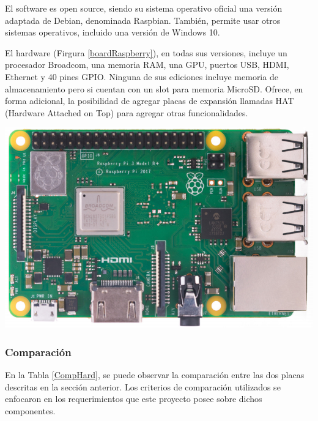             \par El software es open source, siendo su sistema operativo oficial una versión adaptada de Debian, denominada Raspbian. También, permite usar otros sistemas operativos, incluido una versión de Windows 10.
        
            \par El hardware (Firgura \ref{boardRaspberry}), en todas sus versiones, incluye un procesador Broadcom, una memoria RAM, una GPU, puertos USB, HDMI, Ethernet y 40 pines GPIO. Ninguna de sus ediciones incluye memoria de almacenamiento pero si cuentan con un slot para memoria MicroSD. Ofrece, en forma adicional, la posibilidad de agregar placas de expansión llamadas HAT (Hardware Attached on Top) para agregar otras funcionalidades.
            
            \begin{minipage}{0.95\textwidth}
            
            \begin{center}
                \includegraphics[scale=0.30]{hardware/raspberrypib3.jpg}
                
                \label{boardRaspberry}
            \end{center}
            \end{minipage}
            \begin{minipage}{0.95\textwidth}
            \subsubsection{Comparación}
                \par En la Tabla \ref{CompHard}, se puede observar la comparación entre las dos placas descritas en la sección anterior. Los criterios de comparación utilizados se enfocaron en los requerimientos que este proyecto posee sobre dichos componentes.
            \end{minipage}
        
